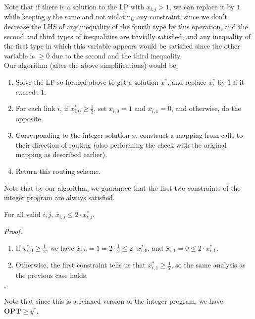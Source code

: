 \documentclass[a4paper]{article}
\newenvironment{proof}{\begin{breakbox}\textit{Proof.}}{\hfill$\square$\end{breakbox}}
\newcommand{\nl}{\vspace{0.2cm}\\}
\newcommand{\OPT}{\mathbf{OPT}}
\begin{document}
Note that if there is a solution to the LP with $x_{i, j} > 1$, we can replace it by $1$ while keeping $y$ the same and not violating any constraint, since we don't decrease the LHS of any
inequality of the fourth type by this operation, and the second and third types of inequalities are trivially satisfied, and any inequality of the first type in which this variable appears
would be satisfied since the other variable is $\ge 0$ due to the second and the third inequality.\nl
Our algorithm (after the above simplifications) would be:
\begin{enumerate}
    \item Solve the LP so formed above to get a solution $x^*$, and replace $x^*_i$ by $1$ if it exceeds $1$.
    \item For each link $i$, if $x^*_{i, 0} \ge \frac{1}{2}$, set $\overline{x}_{i, 0} = 1$ and $\overline{x}_{i, 1} = 0$, and otherwise, do the opposite.
    \item Corresponding to the integer solution $\overline{x}$, construct a mapping from calls to their direction of routing (also performing the check with the original mapping as described
        earlier).
    \item Return this routing scheme.
\end{enumerate}

Note that by our algorithm, we guarantee that the first two constraints of the integer program are always satisfied.\nl

\begin{claim}
    For all valid $i, j$, $\overline{x}_{i, j} \le 2 \cdot x^*_{i, j}$.
\end{claim}
\begin{proof}
\begin{enumerate}
    \item If $x^*_{i, 0} \ge \frac{1}{2}$, we have $\overline{x}_{i, 0} = 1 = 2 \cdot \frac{1}{2} \le 2 \cdot x^*_{i, 0}$, and $\overline{x}_{i, 1} = 0 \le 2 \cdot x^*_{i, 1}$.
    \item Otherwise, the first constraint tells us that $x^*_{i, 1} \ge \frac{1}{2}$, so the same analysis as the previous case holds.
\end{enumerate}
\end{proof}

Note that since this is a relaxed version of the integer program, we have $\OPT \ge y^*$.\nl
\end{document}
